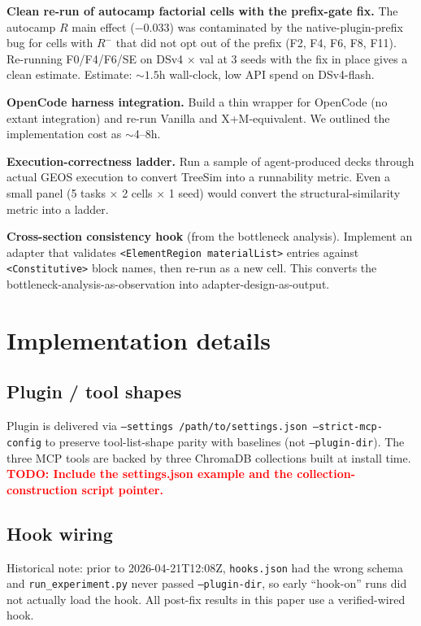 \documentclass{article}
\newcommand{\todo}[1]{\textcolor{red}{\textbf{TODO: #1}}}
\begin{document}
\textbf{Clean re-run of autocamp factorial cells with the prefix-gate fix.} The autocamp $R$ main effect ($-0.033$) was contaminated by the native-plugin-prefix bug for cells with $R^{-}$ that did not opt out of the prefix (F2, F4, F6, F8, F11). Re-running F0/F4/F6/SE on DSv4 × val at 3 seeds with the fix in place gives a clean estimate. Estimate: ${\sim}1.5$h wall-clock, low API spend on DSv4-flash.

\textbf{OpenCode harness integration.} Build a thin wrapper for OpenCode (no extant integration) and re-run Vanilla and X+M-equivalent. We outlined the implementation cost as $\sim$4--8h.

\textbf{Execution-correctness ladder.} Run a sample of agent-produced decks through actual GEOS execution to convert TreeSim into a runnability metric. Even a small panel (5 tasks × 2 cells × 1 seed) would convert the structural-similarity metric into a ladder.

\textbf{Cross-section consistency hook} (from the bottleneck analysis). Implement an adapter that validates \texttt{<ElementRegion materialList>} entries against \texttt{<Constitutive>} block names, then re-run as a new cell. This converts the bottleneck-analysis-as-observation into adapter-design-as-output.

\section{Implementation details}
\label{app:impl}

\subsection{Plugin / tool shapes}
Plugin is delivered via \texttt{--settings /path/to/settings.json --strict-mcp-config} to preserve tool-list-shape parity with baselines (not \texttt{--plugin-dir}). The three MCP tools are backed by three ChromaDB collections built at install time. \todo{Include the settings.json example and the collection-construction script pointer.}

\subsection{Hook wiring}
Historical note: prior to 2026-04-21T12:08Z, \texttt{hooks.json} had the wrong schema and \texttt{run\_experiment.py} never passed \texttt{--plugin-dir}, so early ``hook-on'' runs did not actually load the hook. All post-fix results in this paper use a verified-wired hook.
\end{document}
